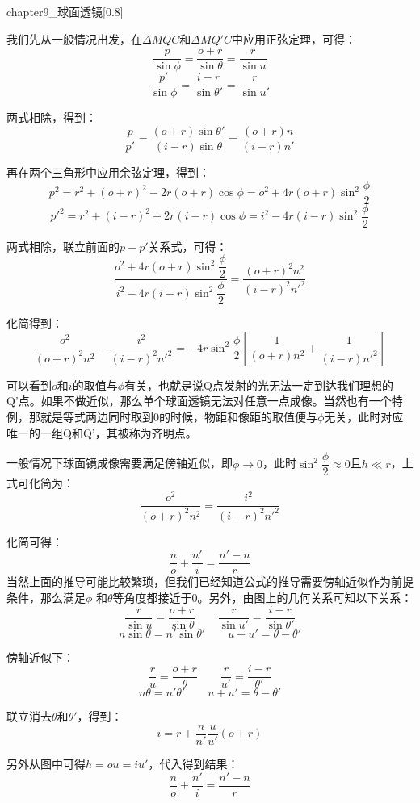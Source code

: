 \begin{prove}[球面透镜的成像规律]
  \begin{singlefigure}[球面透镜]{chapter9_球面透镜}[0.8]
  \end{singlefigure}

  我们先从一般情况出发，在$\Delta MQC$和$\Delta MQ'C$中应用正弦定理，可得：
  \[\dfrac{p}{\sin \phi} = \dfrac{o + r}{\sin \theta} = \dfrac{r}{\sin u}\]
  \[\dfrac{p'}{\sin \phi} = \dfrac{i - r}{\sin \theta'} = \dfrac{r}{\sin u'}\]

  两式相除，得到：
  \[\dfrac{p}{p'} = \dfrac{(o+r)\sin \theta'}{(i-r)\sin \theta} = \dfrac{(o+r)n}{(i-r)n'}\]

  再在两个三角形中应用余弦定理，得到：
  \[p^2 = r^2 + (o+r)^2 - 2r(o+r)\cos\phi = o^2 + 4r(o+r)\sin^2\dfrac{\phi}{2}\]
  \[p'^2 = r^2 + (i-r)^2 + 2r(i-r)\cos\phi = i^2 - 4r(i-r)\sin^2\dfrac{\phi}{2}\]

  两式相除，联立前面的$p - p'$关系式，可得：
  \[\dfrac{o^2 + 4r(o+r)\sin^2\dfrac{\phi}{2}}{i^2 - 4r(i-r)\sin^2\dfrac{\phi}{2}} = \dfrac{(o+r)^2 n^2}{(i-r)^2 n'^2}\]

  化简得到：
  \[\dfrac{o^2}{(o+r)^2 n^2} - \dfrac{i^2}{(i-r)^2 n'^2} = -4r\sin^2\dfrac{\phi}{2}\left[\dfrac{1}{(o+r)n^2} + \dfrac{1}{(i-r)n'^2}\right]\]

  可以看到$o$和$i$的取值与$\phi$有关，也就是说Q点发射的光无法一定到达我们理想的Q'点。如果不做近似，那么单个球面透镜无法对任意一点成像。当然也有一个特例，那就是等式两边同时取到0的时候，物距和像距的取值便与$\phi$无关，此时对应唯一的一组Q和Q'，其被称为齐明点。

  一般情况下球面镜成像需要满足傍轴近似，即$\phi\rightarrow 0$，此时$\sin^2\dfrac{\phi}{2} \approx 0$且$h \ll r$，上式可化简为：
  \[\dfrac{o^2}{(o+r)^2 n^2} = \dfrac{i^2}{(i-r)^2 n'^2}\]

  化简可得：
  \[\dfrac{n}{o} + \dfrac{n'}{i} = \dfrac{n'-n}{r}\]
  \tcbrule
  当然上面的推导可能比较繁琐，但我们已经知道公式的推导需要傍轴近似作为前提条件，那么满足$\phi$ 和$\theta$等角度都接近于0。另外，由图上的几何关系可知以下关系：
  \[\dfrac{r}{\sin u} = \dfrac{o+r}{\sin \theta}\qquad \dfrac{r}{\sin u'} = \dfrac{i-r}{\sin \theta'}\]
  \[n\sin\theta = n'\sin\theta'\qquad u+u' = \theta - \theta'\]

  傍轴近似下：
  \[\dfrac{r}{u} = \dfrac{o+r}{\theta}\qquad \dfrac{r}{u'} = \dfrac{i-r}{\theta'}\]
  \[n\theta = n'\theta'\qquad u+u' = \theta - \theta'\]

  联立消去$\theta$和$\theta'$，得到：
  \[i = r + \dfrac{n}{n'}\dfrac{u}{u'}(o+r)\]

  另外从图中可得$h = ou = iu'$，代入得到结果：
  \[\dfrac{n}{o} + \dfrac{n'}{i} = \dfrac{n'-n}{r}\]
\end{prove}

